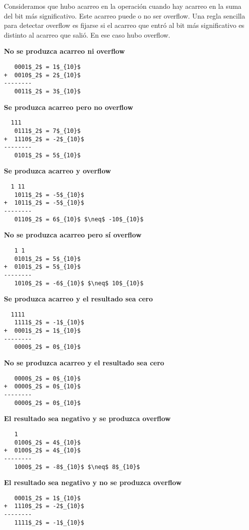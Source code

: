 Consideramos que hubo acarreo en la operación cuando hay acarreo en la suma del bit más significativo. Este acarreo puede o no ser overflow. Una regla sencilla para detectar overflow es fijarse si el acarreo que entró al bit más significativo es distinto al acarreo que salió. En ese caso hubo overflow.

\textbf{No se produzca acarreo ni overflow}
\begin{lstlisting}
   0001$_2$ = 1$_{10}$
+  0010$_2$ = 2$_{10}$
--------
   0011$_2$ = 3$_{10}$
\end{lstlisting}

\textbf{Se produzca acarreo pero no overflow}
\begin{lstlisting}
  111
   0111$_2$ = 7$_{10}$
+  1110$_2$ = -2$_{10}$
--------
   0101$_2$ = 5$_{10}$
\end{lstlisting}

\textbf{Se produzca acarreo y overflow}
\begin{lstlisting}
  1 11
   1011$_2$ = -5$_{10}$
+  1011$_2$ = -5$_{10}$
--------
   0110$_2$ = 6$_{10}$ $\neq$ -10$_{10}$
\end{lstlisting}

\textbf{No se produzca acarreo pero sí overflow}
\begin{lstlisting}
   1 1
   0101$_2$ = 5$_{10}$
+  0101$_2$ = 5$_{10}$
--------
   1010$_2$ = -6$_{10}$ $\neq$ 10$_{10}$
\end{lstlisting}

\textbf{Se produzca acarreo y el resultado sea cero}
\begin{lstlisting}
  1111
   1111$_2$ = -1$_{10}$
+  0001$_2$ = 1$_{10}$
--------
   0000$_2$ = 0$_{10}$
\end{lstlisting}

\textbf{No se produzca acarreo y el resultado sea cero}
\begin{lstlisting}
   0000$_2$ = 0$_{10}$
+  0000$_2$ = 0$_{10}$
--------
   0000$_2$ = 0$_{10}$
\end{lstlisting}

\textbf{El resultado sea negativo y se produzca overflow}
\begin{lstlisting}
   1
   0100$_2$ = 4$_{10}$
+  0100$_2$ = 4$_{10}$
--------
   1000$_2$ = -8$_{10}$ $\neq$ 8$_{10}$
\end{lstlisting}

\textbf{El resultado sea negativo y no se produzca overflow}
\begin{lstlisting}
   0001$_2$ = 1$_{10}$
+  1110$_2$ = -2$_{10}$
--------
   1111$_2$ = -1$_{10}$
\end{lstlisting}

